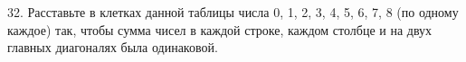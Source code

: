 32. Расставьте в клетках данной таблицы числа 0, 1, 2, 3, 4, 5, 6, 7, 8 (по одному каждое) так, чтобы сумма чисел в каждой строке, каждом столбце и на двух главных диагоналях была одинаковой.
\begin{center}
\begin{figure}[ht!]
\end{figure}
\end{center}
